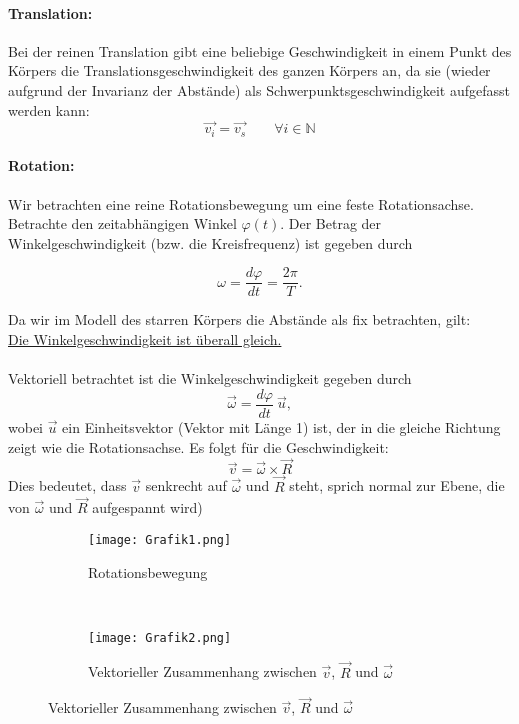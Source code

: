 \documentclass[12pt]{article}
\begin{document}
\paragraph{Translation:}
Bei der reinen Translation gibt eine beliebige Geschwindigkeit in einem Punkt des Körpers die Translationsgeschwindigkeit des ganzen Körpers an, da sie (wieder aufgrund der Invarianz der Abstände) als Schwerpunktsgeschwindigkeit aufgefasst werden kann: 
\begin{equation}
\vec{v_i} = \vec{v_s} \qquad \forall i \in \mathbb{N}
\end{equation}

\begin{figure}[H]
  \label{fig:1teil}
\end{figure} 


\paragraph{Rotation:}
Wir betrachten eine reine Rotationsbewegung um eine feste Rotationsachse. Betrachte den zeitabhängigen Winkel $\varphi (t)$. Der Betrag der Winkelgeschwindigkeit (bzw. die Kreisfrequenz) ist gegeben durch 

\begin{equation}
 \omega = \dfrac{d \varphi}{dt} = \dfrac{2\pi}{T}.
\end{equation}

Da wir im Modell des starren Körpers die Abstände als fix betrachten, gilt: \\
\underline{Die Winkelgeschwindigkeit ist überall gleich.} \\\\
Vektoriell betrachtet ist die Winkelgeschwindigkeit gegeben durch 
\begin{equation}
 \vec{\omega} = \dfrac{d \varphi}{dt} \ \vec{u},
\end{equation}
wobei $\vec{u}$ ein Einheitsvektor (Vektor mit Länge 1) ist, der in die gleiche Richtung zeigt wie die Rotationsachse.
Es folgt für die Geschwindigkeit:
\begin{equation}
\vec{v} = \vec{\omega} \times \vec{R}
\end{equation}
Dies bedeutet, dass $\vec{v}$ senkrecht auf $\vec{\omega}$ und $\vec{R}$ steht, sprich normal zur Ebene, die von $\vec{\omega}$ und $\vec{R}$ aufgespannt wird)\\

\begin{figure}[H]
  \centering
 \begin{subfigure}{0.16\textwidth}
  \texttt{[image: Grafik1.png]}
  \caption{Rotationsbewegung}
 \end{subfigure}
 \ \ \ \ \ \ \ \ \ \ \ \ 
 \begin{subfigure}{0.16\textwidth}
  \texttt{[image: Grafik2.png]}
  \caption{Vektorieller Zusammenhang zwischen $\vec{v}$, $\vec{R}$ und $\vec{\omega}$}
 \end{subfigure}  
 \label{fig:mapComparisons}
\end{figure}
\end{document}
